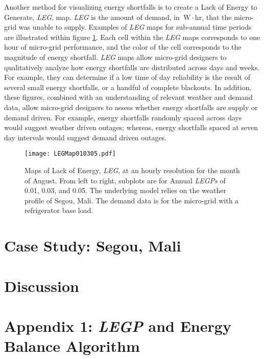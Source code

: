 \documentclass{article}
\newcommand{\unit}[1]{\ensuremath{\, \mathrm{#1}}}
\begin{document}
Another method for visualizing energy shortfalls is to create a Lack of Energy to Generate, \emph{LEG}, map. 
\emph{LEG} is the amount of demand, in \unit{W\! \cdot \! hr}, that the micro-grid was unable to supply.
Examples of \emph{LEG} maps for sub-annual time periods are illustrated within figure \ref{LEGMaps}.
Each cell within the \emph{LEG} maps corresponds to one hour of micro-grid performance, and the color of the cell corresponds to the magnitude of energy shortfall. 
\emph{LEG} maps allow micro-grid designers to qualitatively analyze how energy shortfalls are distributed across days and weeks.
For example, they can determine if a low time of day reliability is the result of several small energy shortfalls, or a handful of complete blackouts. 
In addition, these figures, combined with an understanding of relevant weather and demand data, allow micro-grid designers to assess whether energy shortfalls are supply or demand driven. 
For example, energy shortfalls randomly spaced across days would suggest weather driven outages; whereas, energy shortfalls spaced at seven day intervals would suggest demand driven outages. 


\begin{figure}[ht] 
  \centering
    \texttt{[image: LEGMap010305.pdf]}
  \caption{Maps of Lack of Energy, \emph{LEG}, at an hourly resolution for the month of August.
   From left to right, subplots are for Annual \emph{LEGPs} of 0.01, 0.03, and 0.05. 
  The underlying model relies on the weather profile of Segou, Mali.
  The demand data is for the micro-grid with a refrigerator base load.}
\label{LEGMaps}
\end{figure}







\section{Case Study: Segou, Mali} \label{CaseStudy}

\section{Discussion}

\appendix	
\section{Appendix 1: \emph{LEGP} and Energy Balance Algorithm} \label{A1}
\end{document}
